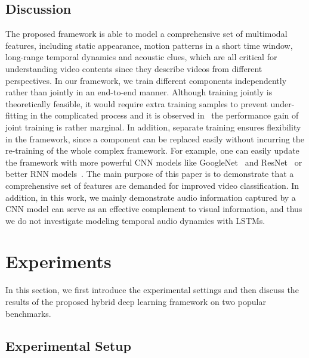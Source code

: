 \documentclass[journal]{IEEEtran}
\begin{document}
\subsection{Discussion}
The proposed framework is able to model a comprehensive set of multimodal features, including static appearance, motion patterns in a short time window, long-range temporal dynamics and acoustic clues, which are all critical for understanding video contents since they describe videos from different perspectives. In our framework, we train different components independently rather than jointly in an end-to-end manner. Although training jointly is theoretically feasible, it would require extra training samples to prevent under-fitting in the complicated process and it is observed in~\cite{Donahue2015} the performance gain of joint training is rather marginal. In addition, separate training ensures flexibility in the framework, since a component can be replaced easily without incurring the re-training of the whole complex framework. For example, one can easily update the framework with more powerful CNN models like GoogleNet~\cite{Szegedy2015} and ResNet~\cite{He2016a} or better RNN models~\cite{DBLP:journals/corr/ChungGCB15}. The main purpose of this paper is to demonstrate that a comprehensive set of features are demanded for improved video classification. In addition, in this work, we mainly demonstrate audio information captured by a CNN model can serve as an effective complement to visual information, and thus we do not investigate modeling temporal audio dynamics with LSTMs.




\section{Experiments}
\label{sec:exp}
In this section, we first introduce the experimental settings and then discuss the results of the proposed hybrid deep learning framework on two popular benchmarks.
\subsection{Experimental Setup}
\end{document}
